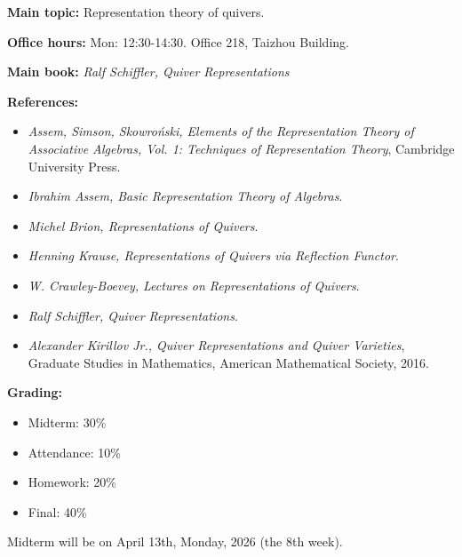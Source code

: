 \documentclass[11pt, a4paper]{report}
\begin{document}
\begin{tcolorbox}[
        enhanced,
        title=\textbf{Course Information},
        colframe=TopicColor,
        colback=TopicBg,
        coltitle=white,
        boxrule=0.5pt,
        leftrule=2pt,
        sharp corners=downhill,
        drop shadow=black!5!white
    ]
    \textbf{\textcolor{TopicColor}{Main topic:}} Representation theory of quivers.

    \textbf{\textcolor{TopicColor}{Office hours:}} Mon: 12:30-14:30. Office 218, Taizhou Building.

    \textbf{\textcolor{TopicColor}{Main book:}} \textit{Ralf Schiffler, Quiver Representations}

    \textbf{\textcolor{TopicColor}{References:}}
    \begin{itemize}[leftmargin=*, nosep, label=\textcolor{TopicColor}{$\bullet$}]
        \item \textit{Assem, Simson, Skowro\'{n}ski, Elements of the Representation Theory of Associative Algebras, Vol. 1: Techniques of Representation Theory}, Cambridge University Press.
        \item \textit{Ibrahim Assem, Basic Representation Theory of Algebras}.
        \item \textit{Michel Brion, Representations of Quivers}.
        \item \textit{Henning Krause, Representations of Quivers via Reflection Functor}.
        \item \textit{W. Crawley-Boevey, Lectures on Representations of Quivers}.
        \item \textit{Ralf Schiffler, Quiver Representations}.
        \item \textit{Alexander Kirillov Jr., Quiver Representations and Quiver Varieties}, Graduate Studies in Mathematics, American Mathematical Society, 2016.
    \end{itemize}
    \textbf{\textcolor{TopicColor}{Grading:}}
    \begin{itemize}[leftmargin=*, nosep, label=\textcolor{TopicColor}{$\bullet$}]
        \item Midterm: 30\%
        \item Attendance: 10\%
        \item Homework: 20\%
        \item Final: 40\%
    \end{itemize}
    Midterm will be on April 13th, Monday, 2026 (the 8th week).
\end{tcolorbox}
\end{document}
